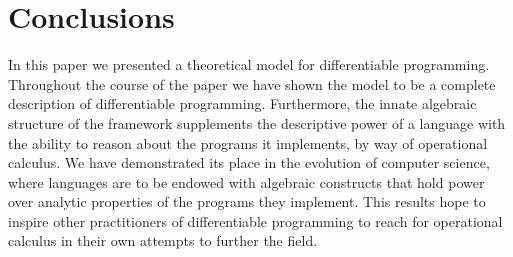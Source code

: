 \section{Conclusions}

In this paper we presented a theoretical model for differentiable programming.
Throughout the course of the paper we have shown the model to be a complete description of differentiable programming.
Furthermore, the innate algebraic structure of the framework supplements the descriptive power of a language with the ability to reason about the programs it implements, by way of operational calculus.
We have demonstrated its place in the evolution of computer science, where languages are to be endowed with algebraic constructs that hold power over analytic properties of the programs they implement.
This results hope to inspire other practitioners of differentiable programming to reach for operational calculus in their own attempts to further the field. 
